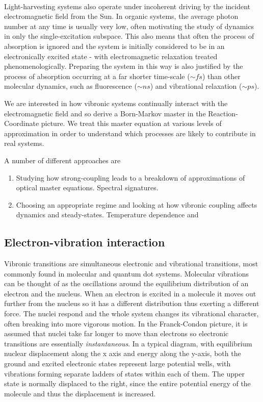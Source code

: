 \documentclass[]{article}
\begin{document}
\begin{itemize}
\\
Light-harvesting systems also operate under incoherent driving by the incident electromagnetic field from the Sun. In organic systems, the average photon number at any time is usually very low, often motivating the study of dynamics in only the single-excitation subspace. This also means that often the process of absorption is ignored and the system is initially considered to be in an electronically excited state - with electromagnetic relaxation treated phenomenologically. Preparing the system in this way is also justified by the process of absorption occurring at a far shorter time-scale ($\sim fs$) than other molecular dynamics, such as fluorescence ($\sim ns$) and vibrational relaxation ($\sim ps$). 

We are interested in how vibronic systems continually interact with the electromagnetic field and so derive a Born-Markov master in the Reaction-Coordinate picture. We treat this master equation at various levels of approximation in order to understand which processes are likely to contribute in real systems.

A number of different approaches are
\begin{enumerate}
	\item Studying how strong-coupling leads to a breakdown of approximations of optical master equations. Spectral signatures.
	\item Choosing an appropriate regime and looking at how vibronic coupling affects dynamics and steady-states. Temperature dependence and 
\end{enumerate}

\subsection{Electron-vibration interaction}

Vibronic transitions are simultaneous electronic and vibrational transitions, most commonly found in molecular and quantum dot systems. Molecular vibrations can be thought of as the oscillations around the equilibrium distribution of an electron and the nucleus. When an electron is excited in a molecule it moves out further from the nucleus so it has a different distribution thus exerting a different force. The nuclei respond and the whole system changes its vibrational character, often breaking into more vigorous motion. In the Franck-Condon picture, it is assumed that nuclei take far longer to move than electrons so electronic transitions are essentially \emph{instantaneous}. In a typical diagram, with equilibrium nuclear displacement along the x axis and energy along the y-axis, both the ground and excited electronic states represent large potential wells, with vibrations forming separate ladders of states within each of them. The upper state is normally displaced to the right, since the entire potential energy of the molecule and thus the displacement is increased.


\end{itemize}
\end{document}
